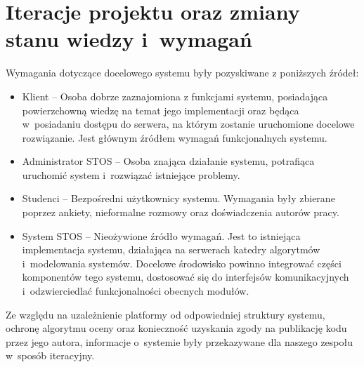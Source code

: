 \section{Iteracje projektu oraz zmiany stanu wiedzy i~wymagań}
Wymagania dotyczące docelowego systemu były pozyskiwane z poniższych źródeł:
\begin{itemize}
    \item Klient -- Osoba dobrze zaznajomiona z funkcjami systemu, posiadająca powierzchowną wiedzę na temat jego implementacji oraz będąca w~posiadaniu dostępu do serwera, na którym zostanie uruchomione docelowe rozwiązanie. Jest głównym źródłem wymagań funkcjonalnych systemu.
    \item Administrator STOS -- Osoba znająca działanie systemu, potrafiąca uruchomić system i~rozwiązać istniejące problemy.
    \item Studenci -- Bezpośredni użytkownicy systemu. Wymagania były zbierane poprzez ankiety, nieformalne rozmowy oraz doświadczenia autorów pracy.
    \item System STOS -- Nieożywione źródło wymagań. Jest to istniejąca implementacja systemu, działająca na serwerach katedry algorytmów i~modelowania systemów. Docelowe środowisko powinno integrować części komponentów tego systemu, dostosować się do interfejsów komunikacyjnych i~odzwierciedlać funkcjonalności obecnych modułów.
\end{itemize}
Ze względu na uzależnienie platformy od odpowiedniej struktury systemu, ochronę algorytmu oceny oraz konieczność uzyskania zgody na publikację kodu przez jego autora, informacje o~systemie były przekazywane dla naszego zespołu w~sposób iteracyjny.

